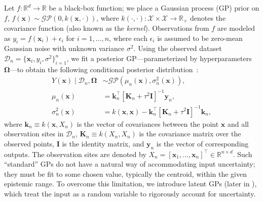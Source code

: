 \documentclass[journal]{new-aiaa}
\newcommand{\mbb}{\mathbb}
\newcommand{\mbf}{\mathbf}
\newcommand{\mcl}{\mathcal}
\newcommand{\bs}{\boldsymbol}
\newcommand{\x}{\mathbf{x}}
\newcommand{\X}{\mathcal{X}}
\begin{document}
Let $f: \mathbb{R}^d \rightarrow \mathbb{R}$ be a black-box function; we place a Gaussian process (GP) prior on $f$, $f(\x) \sim \mcl{GP}(0, k(\x, \cdot))$, where $k(\cdot, \cdot): \X \times \X \rightarrow \mbb{R}_{+}$ denotes the covariance function (also known as the \emph{kernel}). Observations from $f$ are modeled as $y_i = f(\x_i) + \epsilon_i$ for $i=1,\ldots,n$, where each $\epsilon_i$ is assumed to be zero-mean Gaussian noise with unknown variance $\sigma^2$. Using the observed dataset $\mcl{D}_n = \{\x_i, y_i, \sigma^2\}_{i=1}^n$, we fit a posterior GP---parameterized by hyperparameters $\bs{\Omega}$---to obtain the following conditional posterior distribution~\cite{Rasmussen2006}:
\begin{equation*}
\begin{split}
Y(\x) \mid \mcl{D}_n, \bs{\Omega} &\sim \mcl{GP}(\mu_n(\x), \sigma^2_n(\x)), \\
\mu_n(\x) &= \mbf{k}_n^\top [\mbf{K}_n + \tau^2 \mbf{I}]^{-1} \mbf{y}_n, \\
\sigma^2_n(\x) &= k(\x, \x) - \mbf{k}_n^\top [\mbf{K}_n + \tau^2 \mbf{I}]^{-1} \mbf{k}_n,
\end{split}
\end{equation*}
where $\mbf{k}_n \equiv k(\x, X_n)$ is the vector of covariances between the point $\x$ and all observation sites in $\mcl{D}_n$, $\mbf{K}_n \equiv k(X_n, X_n)$ is the covariance matrix over the observed points, $\mbf{I}$ is the identity matrix, and $\mbf{y}_n$ is the vector of corresponding outputs. The observation sites are denoted by $X_n = [\x_1,\ldots,\x_n]^\top \in \mbb{R}^{n \times d}$. Such ``standard'' GPs do not have a natural way of accommodating input uncertainty; they must be fit to some chosen value, typically the centroid, within the given epistemic range. To overcome this limitation, we introduce latent GPs (later in ), which treat the input as a random variable to rigorously account for uncertainty.
\end{document}
